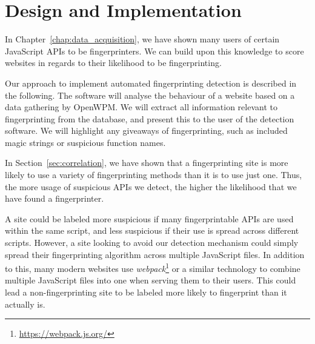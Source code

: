 \documentclass[
    fontsize=12pt,
    headings=small,
    parskip=half,
    bibliography=totoc,
    numbers=noenddot,
    open=any
    ]{scrreprt}
\begin{document}
\chapter{Design and Implementation}
\label{chap:implementation}
In Chapter~\ref{chap:data_acquisition}, we have shown many users of certain JavaScript APIs to be fingerprinters.
We can build upon this knowledge to score websites in regards to their likelihood to be fingerprinting.

Our approach to implement automated fingerprinting detection is described in the following.
The software will analyse the behaviour of a website based on a data gathering by OpenWPM.
We will extract all information relevant to fingerprinting from the database,
and present this to the user of the detection software.
We will highlight any giveaways of fingerprinting, such as included magic strings
or suspicious function names.

In Section~\ref{sec:correlation}, we have shown that a fingerprinting site is more
likely to use a variety of fingerprinting methods than it is to use just one.
Thus, the more usage of suspicious APIs we detect, the higher the likelihood
that we have found a fingerprinter.

A site could be labeled more suspicious if many fingerprintable APIs are used within the same script,
and less suspicious if their use is spread across different scripts.
However, a site looking to avoid our detection mechanism could simply
spread their fingerprinting algorithm across multiple JavaScript files.
In addition to this, many modern websites use \textit{webpack}\footnote{\url{https://webpack.js.org/}}
or a similar technology to combine multiple JavaScript files into one when serving
them to their users. This could lead a non-fingerprinting site to be labeled
more likely to fingerprint than it actually is.
\end{document}
